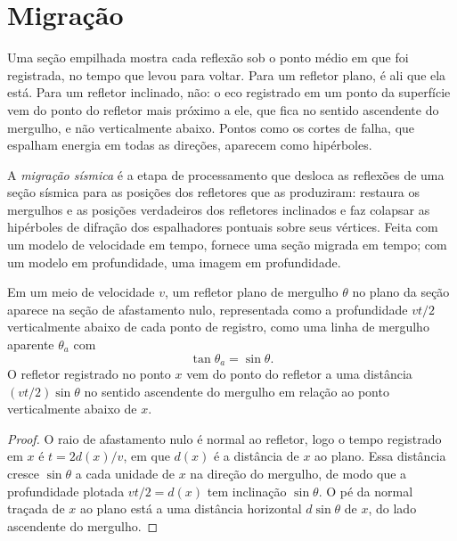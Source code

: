 \section{Migração}

Uma seção empilhada mostra cada reflexão sob o ponto médio em que foi
registrada, no tempo que levou para voltar. Para um refletor plano, é ali que ela está.
Para um refletor inclinado, não: o eco registrado em um ponto da superfície vem do ponto do
refletor mais próximo a ele, que fica no sentido ascendente do mergulho, e não verticalmente
abaixo. Pontos como os cortes de falha, que espalham energia em todas as
direções, aparecem como hipérboles.

\begin{definition}\label{def:b3:exploration-seismology:migration}
A \emph{migração sísmica} é a etapa de processamento que
desloca as reflexões de uma seção sísmica para as posições dos refletores que as
produziram: restaura os mergulhos e as posições verdadeiros dos refletores inclinados e
faz colapsar as hipérboles de difração dos espalhadores pontuais sobre seus vértices.
Feita com um modelo de velocidade em tempo, fornece uma seção migrada em tempo; com um
modelo em profundidade, uma imagem em profundidade.
\end{definition}

\begin{theorem}\label{thm:b3:exploration-seismology:dip}
Em um meio de velocidade $v$, um refletor plano de mergulho $\theta$ no plano da
seção aparece na seção de afastamento nulo, representada como a profundidade $vt/2$
verticalmente abaixo de cada ponto de registro, como uma linha de mergulho aparente $\theta_a$
com
\[
  \tan\theta_a = \sin\theta .
\]
O refletor registrado no ponto $x$ vem do ponto do refletor a uma distância
$(vt/2)\sin\theta$ no sentido ascendente do mergulho em relação ao ponto verticalmente abaixo de $x$.
\end{theorem}

\begin{proof}
O raio de afastamento nulo é normal ao refletor, logo o tempo registrado em $x$ é
$t = 2d(x)/v$, em que $d(x)$ é a distância de $x$ ao plano. Essa distância
cresce $\sin\theta$ a cada unidade de $x$ na direção do mergulho, de modo que a profundidade
plotada $vt/2 = d(x)$ tem inclinação $\sin\theta$. O pé da normal traçada de $x$
ao plano está a uma distância horizontal $d\sin\theta$ de $x$, do lado ascendente do
mergulho.
\end{proof}

